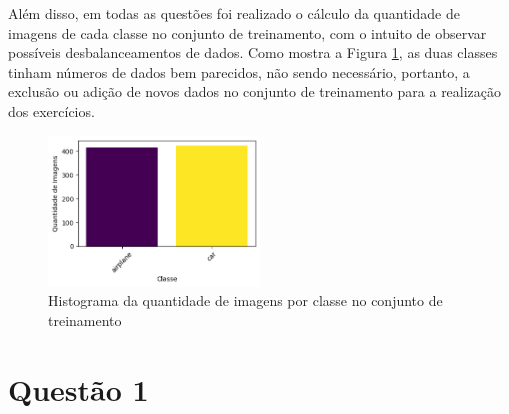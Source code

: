 \documentclass[]{abntex2}
\begin{document}
Além disso, em todas as questões foi realizado o cálculo da quantidade de imagens de cada classe no conjunto de treinamento, com o intuito de observar possíveis desbalanceamentos de dados. Como mostra a Figura \ref{fig:distri}, as duas classes tinham números de dados bem parecidos, não sendo necessário, portanto, a exclusão ou adição de novos dados no conjunto de treinamento para a realização dos exercícios.

\begin{figure}[H]
    \centering 
    \includegraphics[width=0.5\textwidth]{imgs/introduction/distri.png}
    \caption{Histograma da quantidade de imagens por classe no conjunto de treinamento}
    \label{fig:distri} %
\end{figure}




\section*{\textbf{Questão 1}}
\end{document}
